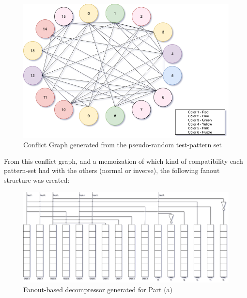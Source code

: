 \documentclass[letterpaper]{article} %
\begin{document}
\begin{figure}[ht]
	\centering
	\includegraphics[width=14.0cm]{grap.png}
	\caption{Conflict Graph generated from the pseudo-random test-pattern set}
\end{figure}

\newpage

From this conflict graph, and a memoization of which kind of compatibility each pattern-set had with the others (normal or inverse), the following fanout structure was created:
\begin{figure}[ht]
	\centering
	\includegraphics[width=16.0cm]{fanout_lines.png}
	\caption{Fanout-based decompressor generated for Part (a)}
\end{figure} 
\end{document}
